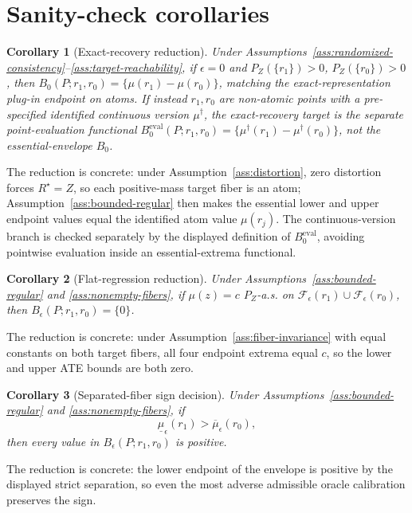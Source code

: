 \documentclass[11pt]{article}
\theoremstyle{definition}
\theoremstyle{plain}
\newtheorem{corollary}{Corollary}
\theoremstyle{remark}
\begin{document}
\section{Sanity-check corollaries}
\begin{corollary}[Exact-recovery reduction]\label{cor:exact}
Under Assumptions~\ref{ass:randomized-consistency}--\ref{ass:target-reachability}, if \(\epsilon=0\) and \(P_Z(\{r_1\})>0\), \(P_Z(\{r_0\})>0\), then \(B_0(P;r_1,r_0)=\{\mu(r_1)-\mu(r_0)\}\), matching the exact-representation plug-in endpoint on atoms.  If instead \(r_1,r_0\) are non-atomic points with a pre-specified identified continuous version \(\mu^\dagger\), the exact-recovery target is the separate point-evaluation functional \(B^{\mathrm{eval}}_0(P;r_1,r_0)=\{\mu^\dagger(r_1)-\mu^\dagger(r_0)\}\), not the essential-envelope \(B_0\).
\end{corollary}
The reduction is concrete: under Assumption~\ref{ass:distortion}, zero distortion forces \(R^\star=Z\), so each positive-mass target fiber is an atom; Assumption~\ref{ass:bounded-regular} then makes the essential lower and upper endpoint values equal the identified atom value \(\mu(r_j)\).  The continuous-version branch is checked separately by the displayed definition of \(B^{\mathrm{eval}}_0\), avoiding pointwise evaluation inside an essential-extrema functional.

\begin{corollary}[Flat-regression reduction]\label{cor:flat}
Under Assumptions~\ref{ass:bounded-regular} and \ref{ass:nonempty-fibers}, if \(\mu(z)=c\) \(P_Z\)-a.s. on \(\mathcal F_\epsilon(r_1)\cup\mathcal F_\epsilon(r_0)\), then \(B_\epsilon(P;r_1,r_0)=\{0\}\).
\end{corollary}
The reduction is concrete: under Assumption~\ref{ass:fiber-invariance} with equal constants on both target fibers, all four endpoint extrema equal \(c\), so the lower and upper ATE bounds are both zero.

\begin{corollary}[Separated-fiber sign decision]\label{cor:separated}
Under Assumptions~\ref{ass:bounded-regular} and \ref{ass:nonempty-fibers}, if
\[
\underline\mu_\epsilon(r_1)>
\overline\mu_\epsilon(r_0),
\]
then every value in \(B_\epsilon(P;r_1,r_0)\) is positive.
\end{corollary}
The reduction is concrete: the lower endpoint of the envelope is positive by the displayed strict separation, so even the most adverse admissible oracle calibration preserves the sign.
\end{document}
